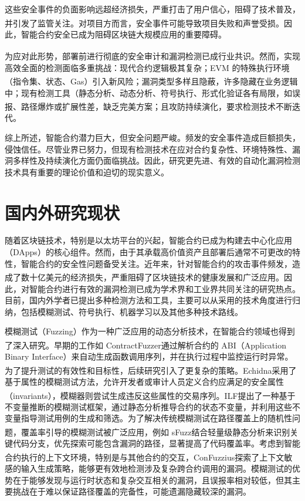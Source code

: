 \documentclass[print, master, vlined, timesmath]{DissertUESTC}
\begin{document}
这些安全事件的负面影响远超经济损失，严重打击了用户信心，阻碍了技术普及，并引发了监管关注\textsuperscript{\cite{SmartContract_2021}}。对项目方而言，安全事件可能导致项目失败和声誉受损。因此，智能合约安全已成为阻碍区块链大规模应用的重要障碍。

为应对此形势，部署前进行彻底的安全审计和漏洞检测已成行业共识\textsuperscript{\cite{FormalMethods_2022}}。然而，实现高效全面的检测面临多重挑战：现代合约逻辑极其复杂；EVM 的特殊执行环境（指令集、状态、Gas）引入新风险；漏洞类型多样且隐蔽\textsuperscript{\cite{Blockchainsmart_2020}}，许多隐藏在业务逻辑中；现有检测工具（静态分析、动态分析、符号执行、形式化验证各有局限，如误报、路径爆炸或扩展性差，缺乏完美方案\textsuperscript{\cite{Howeffective_2020}}；且攻防持续演化，要求检测技术不断迭代。

综上所述，智能合约潜力巨大，但安全问题严峻。频发的安全事件造成巨额损失，侵蚀信任。尽管业界已努力，但现有检测技术在应对合约复杂性、环境特殊性、漏洞多样性及持续演化方面仍面临挑战。因此，研究更先进、有效的自动化漏洞检测技术具有重要的理论价值和迫切的现实意义。


\section{国内外研究现状}

随着区块链技术，特别是以太坊平台的兴起，智能合约已成为构建去中心化应用（DApps）的核心组件。然而，由于其承载高价值资产且部署后通常不可更改的特性，智能合约的安全性问题备受关注。近年来，针对智能合约的攻击事件频发，造成了数十亿美元的经济损失\textsuperscript{\cite{...}}，严重阻碍了区块链技术的健康发展和广泛应用。因此，对智能合约进行有效的漏洞检测已成为学术界和工业界共同关注的研究热点。目前，国内外学者已提出多种检测方法和工具，主要可以从采用的技术角度进行归纳，包括模糊测试、符号执行、机器学习以及其他多种技术路线。

模糊测试（Fuzzing）作为一种广泛应用的动态分析技术，在智能合约领域也得到了深入研究。早期的工作如 ContractFuzzer\textsuperscript{\cite{...}}通过解析合约的 ABI（Application Binary Interface）来自动生成函数调用序列，并在执行过程中监控运行时异常。为了提升测试的有效性和目标性，后续研究引入了更复杂的策略。Echidna\textsuperscript{\cite{...}}采用了基于属性的模糊测试方法，允许开发者或审计人员定义合约应满足的安全属性（invariants），模糊器则尝试生成违反这些属性的交易序列。ILF\textsuperscript{\cite{...}}提出了一种基于不变量推断的模糊测试框架，通过静态分析推导合约的状态不变量，并利用这些不变量指导测试用例的生成和筛选。为了解决传统模糊测试在路径覆盖上的随机性问题，覆盖率引导的模糊测试被广泛应用，例如 sFuzz\textsuperscript{\cite{...}}结合轻量级静态分析来识别关键代码分支，优先探索可能包含漏洞的路径，显著提高了代码覆盖率。考虑到智能合约执行的上下文环境，特别是与其他合约的交互，ConFuzzius\textsuperscript{\cite{...}}探索了上下文敏感的输入生成策略，能够更有效地检测涉及复杂跨合约调用的漏洞。模糊测试的优势在于能够发现与运行时状态和复杂交互相关的漏洞，且误报率相对较低，但其主要挑战在于难以保证路径覆盖的完备性，可能遗漏隐藏较深的漏洞。
\end{document}
